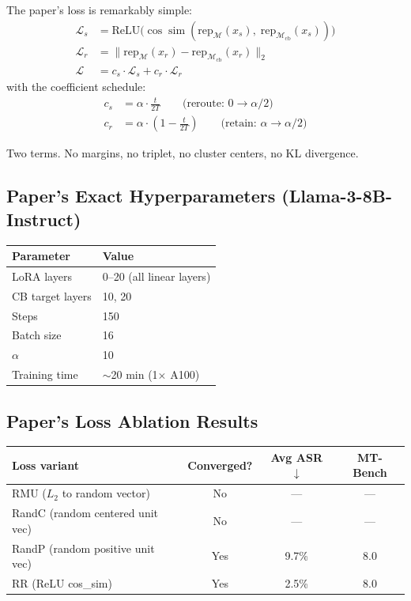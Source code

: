 \documentclass[11pt]{article}
\newcommand{\good}[1]{\textcolor{good}{#1}}
\newcommand{\bad}[1]{\textcolor{bad}{#1}}
\begin{document}
The paper's loss is remarkably simple:
\begin{align}
  \mathcal{L}_s &= \mathrm{ReLU}\bigl(\cos\!\operatorname{sim}(\mathrm{rep}_\mathcal{M}(x_s),\; \mathrm{rep}_{\mathcal{M}_\mathrm{cb}}(x_s))\bigr) \label{eq:rr} \\
  \mathcal{L}_r &= \bigl\| \mathrm{rep}_\mathcal{M}(x_r) - \mathrm{rep}_{\mathcal{M}_\mathrm{cb}}(x_r) \bigr\|_2 \label{eq:retain} \\
  \mathcal{L} &= c_s \cdot \mathcal{L}_s + c_r \cdot \mathcal{L}_r \label{eq:total}
\end{align}
with the coefficient schedule:
\begin{align}
  c_s &= \alpha \cdot \frac{t}{2T} \qquad \text{(reroute: } 0 \to \alpha/2\text{)} \label{eq:cs} \\
  c_r &= \alpha \cdot \left(1 - \frac{t}{2T}\right) \qquad \text{(retain: } \alpha \to \alpha/2\text{)} \label{eq:cr}
\end{align}

\noindent Two terms. No margins, no triplet, no cluster centers, no KL divergence.

\subsection{Paper's Exact Hyperparameters (Llama-3-8B-Instruct)}

\begin{center}
\begin{tabular}{ll}
\toprule
Parameter & Value \\
\midrule
LoRA layers & 0--20 (all linear layers) \\
CB target layers & 10, 20 \\
Steps & 150 \\
Batch size & 16 \\
$\alpha$ & 10 \\
Training time & $\sim$20 min (1$\times$ A100) \\
\bottomrule
\end{tabular}
\end{center}

\subsection{Paper's Loss Ablation Results}

\begin{center}
\begin{tabular}{lccc}
\toprule
Loss variant & Converged? & Avg ASR $\downarrow$ & MT-Bench \\
\midrule
RMU ($L_2$ to random vector) & \bad{No} & --- & --- \\
RandC (random centered unit vec) & \bad{No} & --- & --- \\
RandP (random positive unit vec) & Yes & 9.7\% & 8.0 \\
\good{RR (ReLU cos\_sim)} & \good{Yes} & \good{2.5\%} & \good{8.0} \\
\bottomrule
\end{tabular}
\end{center}
\end{document}
